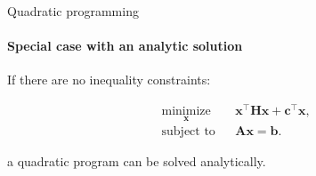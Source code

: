 \documentclass{beamer}
\begin{document}
\begin{frame}{Quadratic programming}
\framesubtitle{Special case with an analytic solution}
\begin{flushleft}

If there are no inequality constraints: 

\begin{equation}
\begin{aligned}
& \underset{\mathbf{x}}{\text{minimize}}
& & \mathbf{x}^\top \mathbf{H} \mathbf{x} + \mathbf{c}^\top\mathbf{x}, \\
& \text{subject to}
& & \mathbf{A} \mathbf{x} = \mathbf{b}.
\end{aligned}
\end{equation}

a quadratic program can be solved analytically.

\end{flushleft}
\end{frame}
\end{document}
